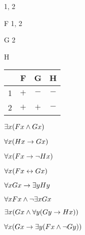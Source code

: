 \begin{minipage}{\textwidth}
\begin{multicols}{2}
	\begin{ekey}
		\item[\text{Domain}] 1, 2
		\item[F] 1, 2
		\item[G] 2
		\item[H]
	\end{ekey}
	
\columnbreak

\begin{tabular}{|c|c|c|c|}
\hline
    &   F   &   G  & H  \\ \hline
1   &   $+$   &   $-$  & $-$  \\ \hline
2   &   $+$   &   $+$ & $-$ \\ \hline
\end{tabular}

\end{multicols}
\end{minipage}



\begin{earg}
\item $\exists x(Fx \wedge Gx)$
\item $\forall x(Hx \rightarrow Gx)$
\item $\forall x(Fx \rightarrow \neg Hx)$
\item $\forall x(Fx \leftrightarrow Gx)$
\item $\forall xGx \rightarrow \exists y Hy$
\item $\forall xFx \wedge \neg \exists xGx$
\item $\exists x(Gx \land \forall y(Gy \rightarrow Hx))$
\item $\forall x(Gx \rightarrow \exists y(Fx \wedge \neg Gy))$ %
\end{earg}


